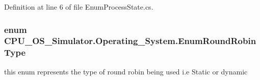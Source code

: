 Definition at line 6 of file Enum\+Process\+State.\+cs.

\hypertarget{namespace_c_p_u___o_s___simulator_1_1_operating___system_a4c7effb8b6725df52018a3a14cede96e}{}
\subsubsection[{Enum\+Round\+Robin\+Type}]{\setlength{\rightskip}{0pt plus 5cm}enum {\bf C\+P\+U\+\_\+\+O\+S\+\_\+\+Simulator.\+Operating\+\_\+\+System.\+Enum\+Round\+Robin\+Type}\hspace{0.3cm}{\ttfamily [strong]}}\label{namespace_c_p_u___o_s___simulator_1_1_operating___system_a4c7effb8b6725df52018a3a14cede96e}


this enum represents the type of round robin being used i.\+e Static or dynamic 

